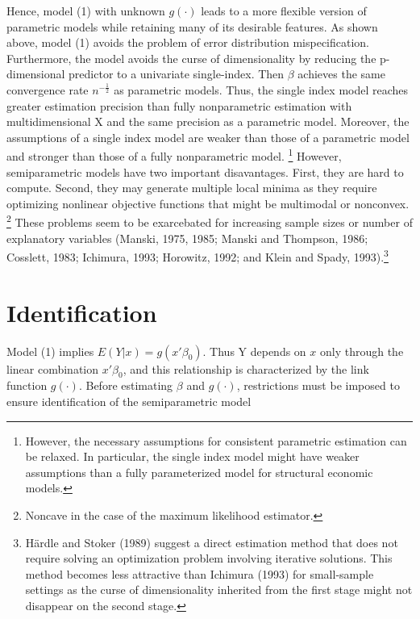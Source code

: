 \documentclass[a4paper]{article}
\begin{document}
Hence, model (1) with unknown $g(\cdot)$ leads to a more flexible version of parametric models while retaining many of its desirable features. As shown above, model (1) avoids the problem of error distribution mispecification. Furthermore, the model avoids the curse of dimensionality by reducing the p-dimensional predictor to a univariate single-index. Then $\beta$ achieves the same convergence rate $n^{-\frac{1}{2}}$ as parametric models. Thus, the single index model reaches greater estimation precision than fully nonparametric estimation with multidimensional X and the same precision as a parametric model. Moreover, the assumptions of a single index model are weaker than those of a parametric model and stronger than those of a fully nonparametric model.  \footnote{However, the necessary assumptions for consistent parametric estimation can be relaxed. In particular, the single index model might have weaker assumptions than a fully parameterized model for structural economic models.} However, semiparametric models have two important disavantages. First, they are hard to compute. Second, they may generate multiple local minima as they require optimizing nonlinear objective functions that might be multimodal or nonconvex. \footnote{Noncave in the case of the maximum likelihood estimator.} These problems seem to be exarcebated for increasing sample sizes or number of explanatory variables (Manski, 1975, 1985; Manski and Thompson, 1986; Cosslett, 1983; Ichimura, 1993; Horowitz, 1992; and Klein and Spady, 1993).\footnote{H{\"a}rdle and Stoker (1989) suggest a direct estimation method that does not require solving an optimization problem involving iterative solutions. This method becomes less attractive than Ichimura (1993) for small-sample settings as the curse of dimensionality inherited from the first stage might not disappear on the second stage. }


\section{Identification} %
\label{sec:Identification}

Model (1) implies $E(Y|x) = g(x'\beta_0)$. Thus Y depends on $x$ only through the linear combination $x'\beta_0$, and this relationship is characterized by the link function $g(\cdot)$. Before estimating  $\beta$ and $ g(\cdot)$, restrictions must be imposed to ensure identification of the semiparametric model
\end{document}
